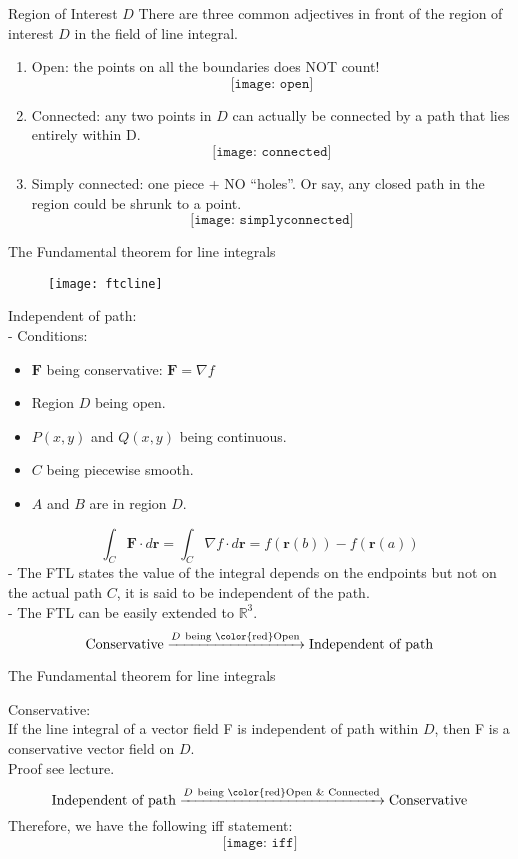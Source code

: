 \documentclass[10pt]{beamer}
\begin{document}
\begin{frame}[allowframebreaks]{Region of Interest  $D$}
	There are three common adjectives in front of the region of interest $D$ in the field of line integral.
	\begin{enumerate}
		\item {\color{red}Open}: the points on all the boundaries does NOT count!$$\texttt{[image: open]}$$
		\item {\color{red}Connected}: any two points in $D$ can
		actually be connected by a path that lies entirely within D.$$\texttt{[image: connected]}$$
		\item {\color{red}Simply connected}: one piece + NO ``holes''. Or say, any closed path in the region could be shrunk to a point.$$\texttt{[image: simplyconnected]}$$
	\end{enumerate}

\end{frame}



\begin{frame}[allowframebreaks]{The Fundamental theorem for line integrals}
	\begin{figure}[H]
		\texttt{[image: ftcline]}
	\end{figure}
	{\color{blue} Independent of path:}\\
	- Conditions:\\
	\begin{itemize}
		\item $\mathbf{F}$ being conservative: $\mathbf{F} = \nabla f$
		\item Region $D$ being {\color{red}open}.
		\item $P(x,y)$ and $Q(x,y)$ being continuous.
		\item $C$ being piecewise smooth.
		\item $A$ and $B$ are in region $D$.
	\end{itemize}
	$$\int_C \mathbf{F}\cdot d\mathbf{r} = \int_C\nabla f\cdot d\mathbf{r} = f(\mathbf{r}(b)) - f(\mathbf{r}(a))$$
	- The FTL states the value of the integral depends {\color{red}on the endpoints} but not on the actual path $C$, it is said to be {\color{blue}independent of the path}.\\
	- The FTL can be easily extended to $\mathbb{R}^3$.
	$$\text{Conservative}\xrightarrow{D ~\text{being {\color{red}Open}}} \text{Independent of path}$$
\end{frame}


\begin{frame}[allowframebreaks]{The Fundamental theorem for line integrals}

{\color{blue}Conservative}:\\
If the line integral of a vector field F is {\color{red}independent of path} within $D$, then F is a
{\color{blue}conservative} vector field on $D$.
\\Proof see lecture.
	$$\text{Independent of path}\xrightarrow{D ~\text{being {\color{red}Open \& Connected}}} \text{Conservative}$$
	$$$$
Therefore, we have the following iff statement:
$$\texttt{[image: iff]}$$
\end{frame}
\end{document}

